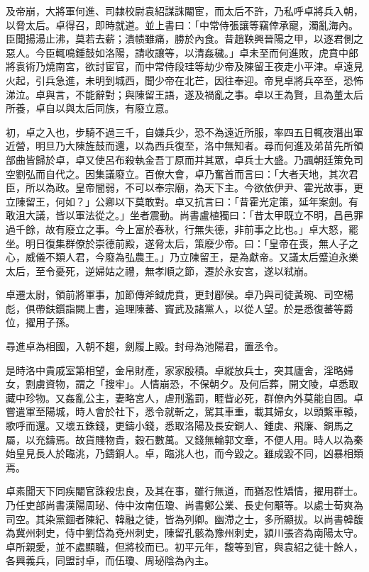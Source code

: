 \begin{pinyinscope}
及帝崩，大將軍何進、司隸校尉袁紹謀誅閹宦，而太后不許，乃私呼卓將兵入朝，以脅太后。卓得召，即時就道。並上書曰：「中常侍張讓等竊倖承寵，濁亂海內。臣聞揚湯止沸，莫若去薪；潰帻雖痛，勝於內食。昔趙鞅興晉陽之甲，以逐君側之惡人。今臣輒鳴鍾鼓如洛陽，請收讓等，以清姦穢。」卓未至而何進敗，虎賁中郎將袁術乃燒南宮，欲討宦官，而中常侍段珪等劫少帝及陳留王夜走小平津。卓遠見火起，引兵急進，未明到城西，聞少帝在北芒，因往奉迎。帝見卓將兵卒至，恐怖涕泣。卓與言，不能辭對；與陳留王語，遂及禍亂之事。卓以王為賢，且為董太后所養，卓自以與太后同族，有廢立意。

初，卓之入也，步騎不過三千，自嫌兵少，恐不為遠近所服，率四五日輒夜潛出軍近營，明旦乃大陳旌鼓而還，以為西兵復至，洛中無知者。尋而何進及弟苗先所領部曲皆歸於卓，卓又使呂布殺執金吾丁原而并其眾，卓兵士大盛。乃諷朝廷策免司空劉弘而自代之。因集議廢立。百僚大會，卓乃奮首而言曰：「大者天地，其次君臣，所以為政。皇帝闇弱，不可以奉宗廟，為天下主。今欲依伊尹、霍光故事，更立陳留王，何如？」公卿以下莫敢對。卓又抗言曰：「昔霍光定策，延年案劍。有敢沮大議，皆以軍法從之。」坐者震動。尚書盧植獨曰：「昔太甲既立不明，昌邑罪過千餘，故有廢立之事。今上富於春秋，行無失德，非前事之比也。」卓大怒，罷坐。明日復集群僚於崇德前殿，遂脅太后，策廢少帝。曰：「皇帝在喪，無人子之心，威儀不類人君，今廢為弘農王。」乃立陳留王，是為獻帝。又議太后蹙迫永樂太后，至令憂死，逆婦姑之禮，無孝順之節，遷於永安宮，遂以弒崩。

卓遷太尉，領前將軍事，加節傳斧鉞虎賁，更封郿侯。卓乃與司徒黃琬、司空楊彪，俱帶鈇鑕詣闕上書，追理陳蕃、竇武及諸黨人，以從人望。於是悉復蕃等爵位，擢用子孫。

尋進卓為相國，入朝不趨，劍履上殿。封母為池陽君，置丞令。

是時洛中貴戚室第相望，金帛財產，家家殷積。卓縱放兵士，突其廬舍，淫略婦女，剽虜資物，謂之「搜牢」。人情崩恐，不保朝夕。及何后葬，開文陵，卓悉取藏中珍物。又姦亂公主，妻略宮人，虐刑濫罰，睚眥必死，群僚內外莫能自固。卓嘗遣軍至陽城，時人會於社下，悉令就斬之，駕其車重，載其婦女，以頭繫車轅，歌呼而還。又壞五銖錢，更鑄小錢，悉取洛陽及長安銅人、鍾虡、飛廉、銅馬之屬，以充鑄焉。故貨賤物貴，穀石數萬。又錢無輪郭文章，不便人用。時人以為秦始皇見長人於臨洮，乃鑄銅人。卓，臨洮人也，而今毀之。雖成毀不同，凶暴相類焉。

卓素聞天下同疾閹官誅殺忠良，及其在事，雖行無道，而猶忍性矯情，擢用群士。乃任吏部尚書漢陽周珌、侍中汝南伍瓊、尚書鄭公業、長史何顒等。以處士荀爽為司空。其染黨錮者陳紀、韓融之徒，皆為列卿。幽滯之士，多所顯拔。以尚書韓馥為冀州刺史，侍中劉岱為兗州刺史，陳留孔骸為豫州刺史，潁川張咨為南陽太守。卓所親愛，並不處顯職，但將校而已。初平元年，馥等到官，與袁紹之徒十餘人，各興義兵，同盟討卓，而伍瓊、周珌陰為內主。


\end{pinyinscope}
